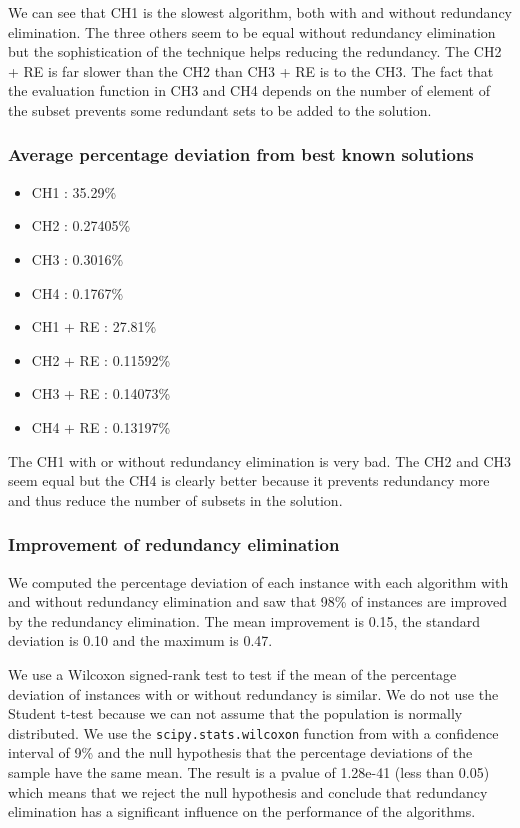 \documentclass[a4paper,12pt]{article}
\begin{document}
We can see that CH1 is the slowest algorithm, both with and without redundancy elimination. The three others seem to be equal without redundancy elimination but the sophistication of the technique helps reducing the redundancy. The CH2 + RE is far slower than the CH2 than CH3 + RE is to the CH3. The fact that the evaluation function in CH3 and CH4 depends on the number of element of the subset prevents some redundant sets to be added to the solution.

\subsubsection{Average percentage deviation from best known solutions}

\begin{itemize}
    \item CH1 : 35.29\%
    \item CH2 : 0.27405\%
    \item CH3 : 0.3016\%
    \item CH4 : 0.1767\%
    \item CH1 + RE : 27.81\%
    \item CH2 + RE : 0.11592\%
    \item CH3 + RE : 0.14073\%
    \item CH4 + RE : 0.13197\%
\end{itemize}

The CH1 with or without redundancy elimination is very bad. The CH2 and CH3 seem equal but the CH4 is clearly better because it prevents redundancy more and thus reduce the number of subsets in the solution.

\subsubsection{Improvement of redundancy elimination}

We computed the percentage deviation of each instance with each algorithm with and without redundancy elimination and saw that 98\% of instances are improved by the redundancy elimination. The mean improvement is 0.15, the standard deviation is 0.10 and the maximum is 0.47.

We use a Wilcoxon signed-rank test to test if the mean of the percentage deviation of instances with or without redundancy is similar. We do not use the Student t-test because we can not assume that the population is normally distributed. We use the \texttt{scipy.stats.wilcoxon} function from \cite{scipywilcoxon} with a confidence interval of 9\% and the null hypothesis that the percentage deviations of the sample have the same mean.
The result is a pvalue of 1.28e-41 (less than 0.05) which means that we reject the null hypothesis and conclude that redundancy elimination has a significant influence on the performance of the algorithms.
\end{document}
